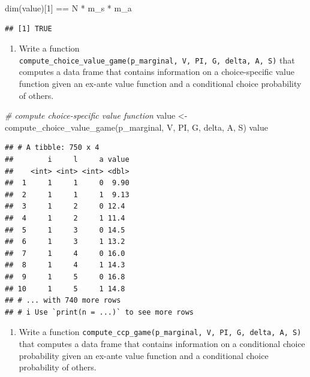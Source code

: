 \documentclass[
]{book}
\newenvironment{Shaded}{\begin{snugshade}}{\end{snugshade}}
\newcommand{\CommentTok}[1]{\textcolor[rgb]{0.56,0.35,0.01}{\textit{#1}}}
\newcommand{\DecValTok}[1]{\textcolor[rgb]{0.00,0.00,0.81}{#1}}
\newcommand{\FunctionTok}[1]{\textcolor[rgb]{0.00,0.00,0.00}{#1}}
\newcommand{\NormalTok}[1]{#1}
\newcommand{\OtherTok}[1]{\textcolor[rgb]{0.56,0.35,0.01}{#1}}
\newcommand{\SpecialCharTok}[1]{\textcolor[rgb]{0.00,0.00,0.00}{#1}}
\providecommand{\tightlist}{%
  \setlength{\itemsep}{0pt}\setlength{\parskip}{0pt}}
\begin{document}
\begin{Shaded}
\begin{Highlighting}[]
\FunctionTok{dim}\NormalTok{(value)[}\DecValTok{1}\NormalTok{] }\SpecialCharTok{==}\NormalTok{ N }\SpecialCharTok{*}\NormalTok{ m\_s }\SpecialCharTok{*}\NormalTok{ m\_a}
\end{Highlighting}
\end{Shaded}

\begin{verbatim}
## [1] TRUE
\end{verbatim}

\begin{enumerate}
\def\labelenumi{\arabic{enumi}.}
\setcounter{enumi}{8}
\tightlist
\item
  Write a function \texttt{compute\_choice\_value\_game(p\_marginal,\ V,\ PI,\ G,\ delta,\ A,\ S)} that computes a data frame that contains information on a choice-specific value function given an ex-ante value function and a conditional choice probability of others.
\end{enumerate}

\begin{Shaded}
\begin{Highlighting}[]
\CommentTok{\# compute choice{-}specific value function}
\NormalTok{value }\OtherTok{\textless{}{-}} \FunctionTok{compute\_choice\_value\_game}\NormalTok{(p\_marginal, V, PI, G, delta, A, S)}
\NormalTok{value}
\end{Highlighting}
\end{Shaded}

\begin{verbatim}
## # A tibble: 750 x 4
##        i     l     a value
##    <int> <int> <int> <dbl>
##  1     1     1     0  9.90
##  2     1     1     1  9.13
##  3     1     2     0 12.4 
##  4     1     2     1 11.4 
##  5     1     3     0 14.5 
##  6     1     3     1 13.2 
##  7     1     4     0 16.0 
##  8     1     4     1 14.3 
##  9     1     5     0 16.8 
## 10     1     5     1 14.8 
## # ... with 740 more rows
## # i Use `print(n = ...)` to see more rows
\end{verbatim}

\begin{enumerate}
\def\labelenumi{\arabic{enumi}.}
\setcounter{enumi}{9}
\tightlist
\item
  Write a function \texttt{compute\_ccp\_game(p\_marginal,\ V,\ PI,\ G,\ delta,\ A,\ S)} that computes a data frame that contains information on a conditional choice probability given an ex-ante value function and a conditional choice probability of others.
\end{enumerate}
\end{document}
